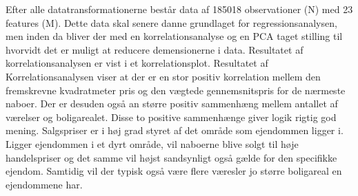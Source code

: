 \documentclass{report}
\begin{document}
Efter alle datatransformationerne består data af 185018 observationer (N) med 23 features (M).
Dette data skal senere danne grundlaget for regressionsanalysen, men inden da bliver der med en korrelationsanalyse og en PCA taget stilling til hvorvidt det er muligt at reducere demensionerne i data. 
Resultatet af korrelationsanalysen er vist i et korrelationsplot. Resultatet af Korrelationsanalysen viser at der er en stor positiv korrelation mellem den fremskrevne kvadratmeter pris og den vægtede gennemsnitspris for de nærmeste naboer. Der er desuden også an større positiv sammenhæng mellem antallet af værelser og boligarealet. 
Disse to positive sammenhænge giver logik rigtig god mening. Salgspriser er i høj grad styret af det område som ejendommen ligger i. Ligger ejendommen i et dyrt område, vil naboerne blive solgt til høje handelspriser og det samme vil højst sandsynligt også gælde for den specifikke ejendom. 
Samtidig vil der typisk også være flere væresler jo større boligareal en ejendommene har. 
\end{document}
